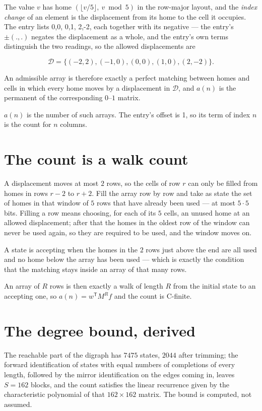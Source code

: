 \documentclass[11pt]{article}
\theoremstyle{definition}
\begin{document}
The value $v$ has home $(\lfloor v/5\rfloor,\ v \bmod 5)$ in the row-major layout, and the {\itshape index change} of an element is the displacement from its home to the cell it occupies. The entry lists 0,0, 0,1, 2,-2, each together with its negative --- the entry's $\pm(.,.)$ negates the displacement as a whole, and the entry's own terms distinguish the two readings, so the allowed displacements are

\[\mathcal{D} = \{(-2,2), (-1,0), (0,0), (1,0), (2,-2)\}.\]

An admissible array is therefore exactly a perfect matching between homes and cells in which every home moves by a displacement in $\mathcal{D}$, and $a(n)$ is the permanent of the corresponding $0$--$1$ matrix.

$a(n)$ is the number of such arrays. The entry's offset is 1, so its term of index $n$ is the count for $n$ columns.

\section{The count is a walk count}

A displacement moves at most $2$ rows, so the cells of row $r$ can only be filled from homes in rows $r-2$ to $r+2$. Fill the array row by row and take as state the set of homes in that window of $5$ rows that have already been used --- at most $5\cdot5$ bits. Filling a row means choosing, for each of its $5$ cells, an unused home at an allowed displacement; after that the homes in the oldest row of the window can never be used again, so they are required to be used, and the window moves on.

A state is accepting when the homes in the $2$ rows just above the end are all used and no home below the array has been used --- which is exactly the condition that the matching stays inside an array of that many rows.

An array of $R$ rows is then exactly a walk of length $R$ from the initial state to an accepting one, so $a(n) = w^{\mathsf T}M^{R}f$ and the count is C-finite.

\section{The degree bound, derived}

The reachable part of the digraph has $7475$ states, $2044$ after trimming; the forward identification of states with equal numbers of completions of every length, followed by the mirror identification on the edges coming in, leaves $S = 162$ blocks, and the count satisfies the linear recurrence given by the characteristic polynomial of that $162\times162$ matrix. The bound is computed, not assumed.
\end{document}
